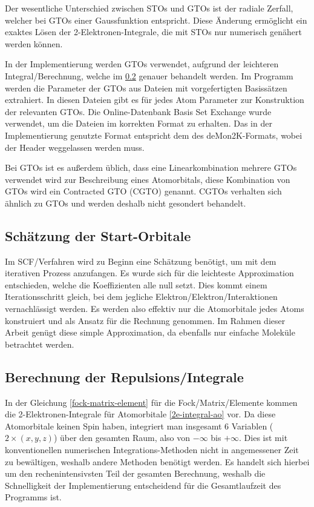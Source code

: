 \begin{enumerate}
    \cite[Ab. 6.2.1]{cramer_2004}
\end{enumerate}

Der wesentliche Unterschied zwischen STOs und GTOs ist der radiale Zerfall,
welcher bei GTOs einer Gaussfunktion entspricht.
Diese Änderung ermöglicht ein exaktes Lösen der 2-Elektronen-Integrale,
die mit STOs nur numerisch genähert werden können.\cite[6.2.1]{cramer_2004}

In der Implementierung werden GTOs verwendet, aufgrund der leichteren Integral\-/Berechnung,
welche im \cref{repulsion-integrals-section} genauer behandelt werden.
Im Programm werden die Parameter der GTOs aus Dateien mit vorgefertigten Basissätzen extrahiert.
In diesen Dateien gibt es für jedes Atom Parameter zur Konstruktion der relevanten GTOs.
Die Online-Datenbank Basis Set Exchange \cite{bse} wurde verwendet,
um die Dateien im korrekten Format zu erhalten.
Das in der Implementierung genutzte Format entspricht dem des deMon2K-Formats,
wobei der Header weggelassen werden muss.

Bei GTOs ist es außerdem üblich, dass eine Linearkombination mehrere GTOs verwendet wird 
zur Beschreibung eines Atomorbitals, diese Kombination von GTOs wird ein Contracted GTO (CGTO) genannt.
CGTOs verhalten sich ähnlich zu GTOs und werden deshalb nicht gesondert behandelt.
\cite[S.255-256]{lewars_2016}

\subsection{Schätzung der Start-Orbitale}
Im SCF\-/Verfahren wird zu Beginn eine Schätzung benötigt,
um mit dem iterativen Prozess anzufangen.
Es wurde sich für die leichteste Approximation entschieden, welche die Koeffizienten alle null setzt.
Dies kommt einem Iterationsschritt gleich,
bei dem jegliche Elektron\-/Elektron\-/Interaktionen vernachlässigt werden.
Es werden also effektiv nur die Atomorbitale jedes Atoms konstruiert
und als Ansatz für die Rechnung genommen. Im Rahmen dieser Arbeit genügt diese simple Approximation,
da ebenfalls nur einfache Moleküle betrachtet werden.

\subsection{Berechnung der Repulsions\-/Integrale}\label{repulsion-integrals-section}
In der Gleichung \cref{fock-matrix-element} für die Fock\-/Matrix\-/Elemente kommen die
2-Elektronen-Integrale für Atomorbitale \cref{2e-integral-ao} vor.
Da diese Atomorbitale keinen Spin haben, integriert man insgesamt 6 Variablen
($2\times (x,y,z)$) über den gesamten Raum, also von $-\infty$ bis $+\infty$.
Dies ist mit konventionellen numerischen Integrations-Methoden nicht in angemessener Zeit
zu bewältigen, weshalb andere Methoden benötigt werden. Es handelt sich hierbei 
um den rechenintensivsten Teil der gesamten Berechnung, weshalb die Schnelligkeit
der Implementierung entscheidend für die Gesamtlaufzeit des Programms ist.

